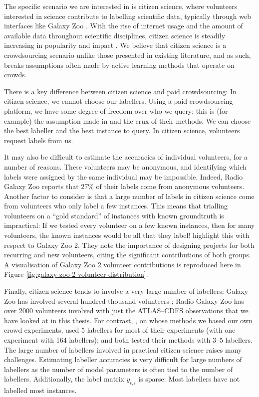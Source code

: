     The specific scenario we are interested in is citizen science, where
    volunteers interested in science contribute to labelling scientific data,
    typically through web interfaces like Galaxy Zoo \citep{lintott11}. With the
    rise of internet usage and the amount of available data throughout
    scientific disciplines, citizen science is steadily increasing in popularity
    and impact \citep{marshall15}. We believe that citizen science is a
    crowdsourcing scenario unlike those presented in existing literature, and as
    such, breaks assumptions often made by active learning methods that operate
    on crowds.

    There is a key difference between citizen science and paid crowdsourcing: In
    citizen science, we cannot choose our labellers. Using a paid crowdsourcing
    platform, we have some degree of freedom over who we query; this is (for
    example) the assumption made in \citet{yan11} and the crux of their methods.
    We can choose the best labeller and the best instance to query. In citizen
    science, volunteers request labels from us.

    It may also be difficult to estimate the accuracies of individual
    volunteers, for a number of reasons. These volunteers may be anonymous, and
    identifying which labels were assigned by the same individual may be
    impossible. Indeed, Radio Galaxy Zoo reports that 27\% of their labels come
    from anonymous volunteers. Another factor to consider is that a large number
    of labels in citizen science come from volunteers who only label a few
    instances. This means that trialling volunteers on a ``gold standard'' of
    instances with known groundtruth is impractical: If we tested every
    volunteer on a few known instances, then for many volunteers, the known
    instances would be all that they label! \citet{marshall15} highlight this
    with respect to Galaxy Zoo 2. They note the importance of designing projects
    for both recurring and new volunteers, citing the significant contributions
    of both groups. A visualisation of Galaxy Zoo 2 volunteer contributions is
    reproduced here in Figure \ref{fig:galaxy-zoo-2-volunteer-distribution}.

    Finally, citizen science tends to involve a very large number of labellers:
    Galaxy Zoo has involved several hundred thousand volunteers
    \citep{marshall15}; Radio Galaxy Zoo has over 2000 volunteers involved with
    just the ATLAS--CDFS observations that we have looked at in this thesis. For
    contrast, \citet{raykar10}, on whose methods we based our own crowd
    experiments, used 5 labellers for most of their experiments (with one
    experiment with 164 labellers); \citet{mozafari12} and \citet{yan11} both
    tested their methods with 3--5 labellers. The large number of labellers
    involved in practical citizen science raises many challenges. Estimating
    labeller accuracies is very difficult for large numbers of labellers as the
    number of model parameters is often tied to the number of labellers.
    Additionally, the label matrix $y_{t, i}$ is sparse: Most labellers have not
    labelled most instances.


